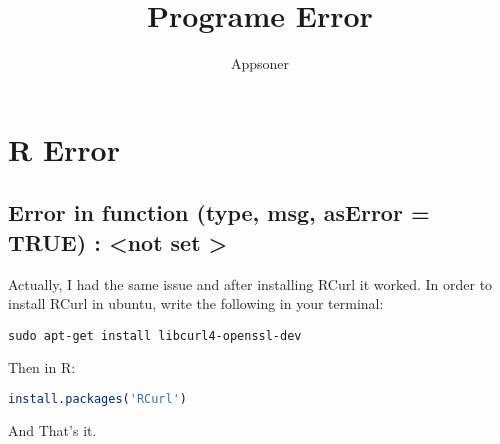 \documentclass{article}
\title{Programe Error}
\author{Appsoner}
\begin{document}
\maketitle
\tableofcontents
\section{R Error}
\subsection{ Error in function (type, msg, asError = TRUE) : \textless not set \textgreater}

Actually, I had the same issue and after installing RCurl it worked.
In order to install RCurl in ubuntu, write the following in your terminal:
\begin{lstlisting}
sudo apt-get install libcurl4-openssl-dev
\end{lstlisting}
Then in R:
\begin{lstlisting}[language = R]
install.packages('RCurl')
\end{lstlisting}
And That\textquoteright s it.
\end{document}

